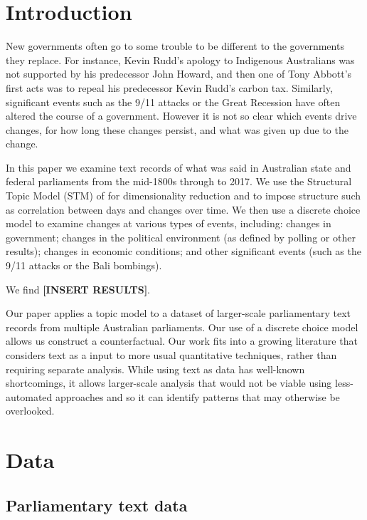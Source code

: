 \documentclass[12pt,]{article}
\theoremstyle{definition}
\theoremstyle{definition}
\theoremstyle{definition}
\theoremstyle{remark}
\begin{document}
\vskip 6.5pt


\noindent  \section{Introduction}\label{introduction}

New governments often go to some trouble to be different to the
governments they replace. For instance, Kevin Rudd's apology to
Indigenous Australians was not supported by his predecessor John Howard,
and then one of Tony Abbott's first acts was to repeal his predecessor
Kevin Rudd's carbon tax. Similarly, significant events such as the 9/11
attacks or the Great Recession have often altered the course of a
government. However it is not so clear which events drive changes, for
how long these changes persist, and what was given up due to the change.

In this paper we examine text records of what was said in Australian
state and federal parliaments from the mid-1800s through to 2017. We use
the Structural Topic Model (STM) of \citet{RobertsStewartAiroldi2016}
for dimensionality reduction and to impose structure such as correlation
between days and changes over time. We then use a discrete choice model
to examine changes at various types of events, including: changes in
government; changes in the political environment (as defined by polling
or other results); changes in economic conditions; and other significant
events (such as the 9/11 attacks or the Bali bombings).

We find \textbf{{[}INSERT RESULTS{]}}.

Our paper applies a topic model to a dataset of larger-scale
parliamentary text records from multiple Australian parliaments. Our use
of a discrete choice model allows us construct a counterfactual. Our
work fits into a growing literature that considers text as a input to
more usual quantitative techniques, rather than requiring separate
analysis. While using text as data has well-known shortcomings, it
allows larger-scale analysis that would not be viable using
less-automated approaches and so it can identify patterns that may
otherwise be overlooked.

\section{Data}\label{data}

\subsection{Parliamentary text data}\label{parliamentary-text-data}
\end{document}
